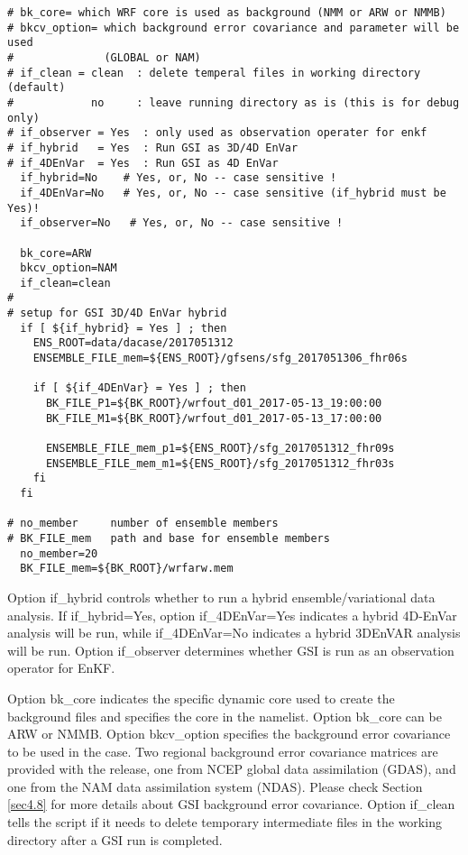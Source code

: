 \begin{footnotesize}
\begin{verbatim}
# bk_core= which WRF core is used as background (NMM or ARW or NMMB)
# bkcv_option= which background error covariance and parameter will be used
#              (GLOBAL or NAM)
# if_clean = clean  : delete temperal files in working directory (default)
#            no     : leave running directory as is (this is for debug only)
# if_observer = Yes  : only used as observation operater for enkf
# if_hybrid   = Yes  : Run GSI as 3D/4D EnVar
# if_4DEnVar  = Yes  : Run GSI as 4D EnVar
  if_hybrid=No    # Yes, or, No -- case sensitive !
  if_4DEnVar=No   # Yes, or, No -- case sensitive (if_hybrid must be Yes)!
  if_observer=No   # Yes, or, No -- case sensitive !

  bk_core=ARW
  bkcv_option=NAM
  if_clean=clean
#
# setup for GSI 3D/4D EnVar hybrid
  if [ ${if_hybrid} = Yes ] ; then
    ENS_ROOT=data/dacase/2017051312
    ENSEMBLE_FILE_mem=${ENS_ROOT}/gfsens/sfg_2017051306_fhr06s

    if [ ${if_4DEnVar} = Yes ] ; then
      BK_FILE_P1=${BK_ROOT}/wrfout_d01_2017-05-13_19:00:00
      BK_FILE_M1=${BK_ROOT}/wrfout_d01_2017-05-13_17:00:00

      ENSEMBLE_FILE_mem_p1=${ENS_ROOT}/sfg_2017051312_fhr09s
      ENSEMBLE_FILE_mem_m1=${ENS_ROOT}/sfg_2017051312_fhr03s
    fi
  fi

# no_member     number of ensemble members
# BK_FILE_mem   path and base for ensemble members
  no_member=20
  BK_FILE_mem=${BK_ROOT}/wrfarw.mem
\end{verbatim}
\end{footnotesize}

Option if\_hybrid controls whether to run a hybrid ensemble/variational data analysis. If if\_hybrid=Yes, option if\_4DEnVar=Yes indicates a hybrid 4D-EnVar analysis will be run, while if\_4DEnVar=No indicates a hybrid 3DEnVAR analysis will be run. Option if\_observer determines whether GSI is run as an observation operator for EnKF.

Option bk\_core indicates the specific dynamic core used to create the background files and specifies the core in the namelist. Option bk\_core can be ARW or NMMB. Option bkcv\_option specifies the background error covariance to be used in the case. Two regional background error covariance matrices are provided with the release, one from NCEP global data assimilation (GDAS), and one from the NAM data assimilation system (NDAS). Please check Section \ref{sec4.8} for more details about GSI background error covariance. Option if\_clean tells the script if it needs to delete temporary intermediate files in the working directory after a GSI run is completed. 

